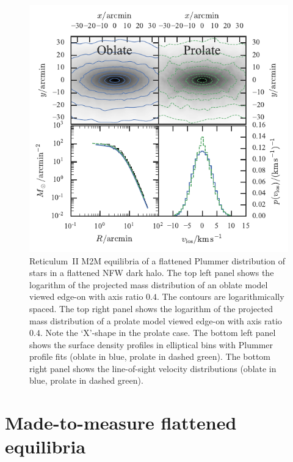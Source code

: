 \documentclass[prd,twocolumn,showpacs,preprintnumbers,superscriptaddress,nofootinbib,amsmath,amssymb,nobalancelastpage]{revtex4}
\begin{document}
\begin{figure}
\includegraphics[width=\columnwidth]{models}
\caption{Reticulum~II M2M equilibria of a flattened Plummer
  distribution of stars in a flattened NFW dark halo. The top left
  panel shows the logarithm of the projected mass distribution of an
  oblate model viewed edge-on with axis ratio $0.4$. The contours are
  logarithmically spaced. The top right panel shows the logarithm of
  the projected mass distribution of a prolate model viewed edge-on
  with axis ratio $0.4$. Note the `X'-shape in the prolate case. The
  bottom left panel shows the surface density profiles in elliptical
  bins with Plummer profile fits (oblate in blue, prolate in dashed
  green). The bottom right panel shows the line-of-sight velocity
  distributions (oblate in blue, prolate in dashed green).}
\label{fig:flattened}
\end{figure}

\section{Made-to-measure flattened equilibria}\label{Sect::M2M}
\end{document}
